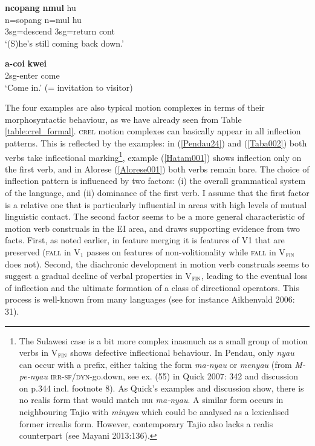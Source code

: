 \ea \label{Taba002}
\gll \textbf{ncopang} \textbf{nmul} hu \\
n=sopang n=mul hu \\
\glc \acs{3}\acs{sg}=descend \acs{3}\acs{sg}=return \acs{cont} \\
\glft `(S)he's still coming back down.' \\ 
\z
\xe

\ea \label{Hatam001}
\gll \textbf{a-coi} \textbf{kwei} \\
\acs{2}\acs{sg}-enter come \\
\glft `Come in.' (= invitation to visitor) \\ 
\z
\xe

The four examples are also typical motion complexes in terms of their morphosyntactic behaviour, as we have already seen from Table \ref{table:crel_formal}. \textsc{crel} motion complexes can basically appear in all inflection patterns. This is reflected by the examples: in (\ref{Pendau24}) and (\ref{Taba002}) both verbs take inflectional marking\footnote{The Sulawesi case is a bit more complex inasmuch as a small group of motion verbs in V$_{\textsc{fin}}$ shows defective inflectional behaviour. In Pendau, only \textit{nyau} can occur with a prefix, either taking the form \textit{ma-nyau} or \textit{menyau} (from \textit{M-pe-nyau} \textsc{irr}-\textsc{sf/dyn}-go.down, see ex. (55) in Quick 2007: 342 and discussion on p.344 incl. footnote 8). As Quick's examples and discussion show, there is no realis form that would match \textsc{irr} \textit{ma-nyau}. A similar form occurs in neighbouring Tajio with \textit{minyau} which could be analysed as a lexicalised former irrealis form. However, contemporary Tajio also lacks a realis counterpart (see Mayani 2013:136).}, example (\ref{Hatam001}) shows inflection only on the first verb, and in Alorese (\ref{Alorese001}) both verbs remain bare. The choice of inflection pattern is influenced by two factors: (i) the overall grammatical system of the language, and (ii) dominance of the first verb. I assume that the first factor is a relative one that is particularly influential in areas with high levels of mutual linguistic contact. The second factor seems to be a more general characteristic of motion verb construals in the EI area, and draws supporting evidence from two facts. First, as noted earlier, in feature merging it is features of V1 that are preserved (\textsc{fall} in V$_{1}$ passes on features of non-volitionality while \textsc{fall} in V$_{\textsc{fin}}$ does not). Second, the diachronic development in motion verb construals seems to suggest a gradual decline of verbal properties in V$_{\textsc{fin}}$, leading to the eventual loss of inflection and the ultimate formation of a class of directional operators. This process is well-known from many languages (see for instance Aikhenvald 2006: 31).

